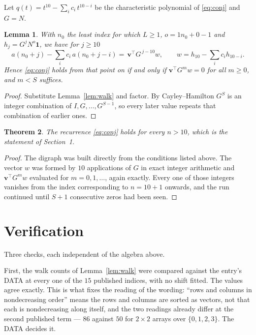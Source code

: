 \documentclass[11pt,a4paper]{article}
\theoremstyle{plain}
\newtheorem{theorem}{Theorem}
\newtheorem{lemma}[theorem]{Lemma}
\theoremstyle{definition}
\begin{document}
Let $q(t)=t^{10}-\sum_i c_i\,t^{10-i}$ be the characteristic polynomial of
\eqref{eq:conj} and $G=N$.

\begin{lemma}\label{lem:crit}
With $n_0$ the least index for which $L\ge1$, $o=1n_0+0-1$ and
$h_j=G^{j}N^{o}\mathbf{1}$, we have for $j\ge10$
\[
a(n_0+j)-\sum_i c_i\,a(n_0+j-i)=\,\mathbf{v}^{\!\top}G^{\,j-10}w,
\qquad w=h_{10}-\sum_i c_ih_{10-i} .
\]
Hence \eqref{eq:conj} holds from that point on if and only if
$\mathbf{v}^{\!\top}G^{m}w=0$ for all $m\ge0$, and $m<S$ suffices.
\end{lemma}

\begin{proof}
Substitute Lemma~\ref{lem:walk} and factor. By Cayley--Hamilton $G^{S}$ is an integer
combination of $I,G,\dots,G^{S-1}$, so every later value repeats that combination of
earlier ones.
\end{proof}

\begin{theorem}
The recurrence \eqref{eq:conj} holds for every $n>10$, which is the statement of
Section~1.
\end{theorem}

\begin{proof}
The digraph was built directly from the conditions listed above. The vector $w$ was formed by
$10$ applications of $G$ in exact integer arithmetic and $\mathbf{v}^{\!\top}G^{m}w$
evaluated for $m=0,1,\dots$, again exactly. Every one of those integers vanishes from the
index corresponding to $n=10+1$ onwards, and the run continued until $S+1$ consecutive
zeros had been seen.
\end{proof}

\section{Verification}

Three checks, each independent of the algebra above.

First, the walk counts of Lemma~\ref{lem:walk} were compared against the entry's DATA at
every one of the $15$ published indices, with no shift fitted. The values agree exactly.
This is what fixes the reading of the wording: ``rows and columns in nondecreasing order''
means the rows and columns are sorted as vectors, not that each is nondecreasing along
itself, and the two readings already differ at the second published term --- $86$ against
$50$ for $2\times2$ arrays over $\{0,1,2,3\}$. The DATA decides it.
\end{document}
